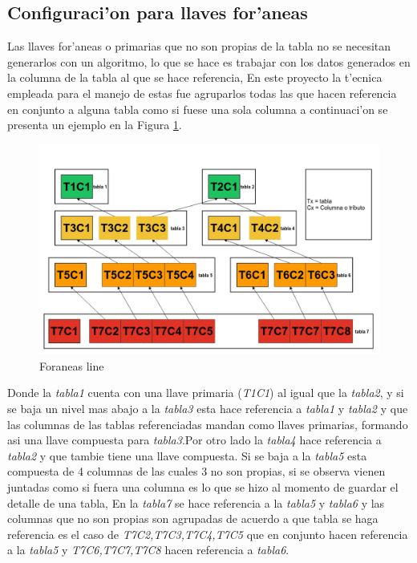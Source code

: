 \subsection{Configuraci'on para llaves for'aneas}
Las llaves for'aneas o primarias que no son propias de la tabla no se necesitan generarlos con un algoritmo, lo que se hace es trabajar con los datos generados en la columna de la tabla al que se hace referencia, En este proyecto la t'ecnica empleada para el manejo de estas fue agruparlos todas las que hacen referencia en conjunto a alguna tabla como si fuese una sola columna a continuaci'on se presenta un ejemplo en la Figura \ref{fig:ejemploForaneasLine}.
\begin{figure}[H]
\centering
\includegraphics[scale=0.4]{images/foraneasline.png}
\caption{Foraneas line}\label{fig:ejemploForaneasLine}
\end{figure}
Donde la \textit{tabla1} cuenta con una llave primaria (\textit{T1C1})  al igual que la \textit{tabla2}, y si se baja un nivel mas abajo a la \textit{tabla3} esta hace referencia a \textit{tabla1} y \textit{tabla2} y que las columnas de las tablas referenciadas mandan como llaves primarias, formando asi una llave compuesta para \textit{tabla3}.Por otro lado la \textit{tabla4} hace referencia a \textit{tabla2} y que tambie tiene una llave compuesta. Si se baja a la \textit{tabla5} esta compuesta de 4 columnas de las cuales 3 no son propias, si se observa vienen juntadas como si fuera una columna es lo que se hizo al momento de guardar el detalle de una tabla, En la \textit{tabla7} se hace referencia a la \textit{tabla5} y \textit{tabla6} y las columnas que no son propias son agrupadas de acuerdo a que tabla se haga referencia es el caso de \textit{T7C2,T7C3,T7C4,T7C5} que en conjunto hacen referencia a la \textit{tabla5} y \textit{T7C6,T7C7,T7C8} hacen referencia a \textit{tabla6}.

